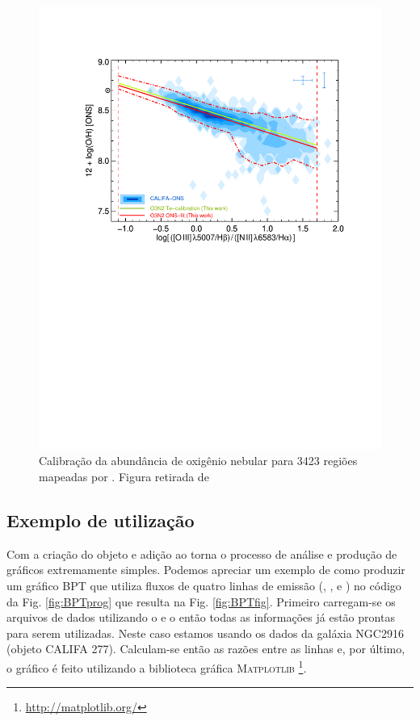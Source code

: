 \begin{figure}
	\centering
	\includegraphics[scale=0.8, trim=2cm 13cm 2cm 3cm, clip]{figuras/O3N2_CALIFA.pdf}
	\caption[Calibração da abundância de oxigênio no gás]{Calibração da abundância de oxigênio 
	nebular	para 3423 regiões \Hii mapeadas por \citet{Sanchez.etal.2013a}. Figura retirada de 
	\citet{Marino.etal.2013a}}
	\label{fig:Marino2013_O3N2}
\end{figure}

\subsection{Exemplo de utilização}
\label{sec:emline:datacube:exemple}

Com a criação do objeto \emldc e adição ao \pycasso torna o processo de análise e produção de
gráficos extremamente simples. Podemos apreciar um exemplo de como produzir um gráfico BPT
\citep{Baldwin.Phillips.Terlevich.1981a} que utiliza fluxos de quatro linhas de emissão (\Halpha,
\Hbeta, \OIII e \NII) no código da Fig. \ref{fig:BPTprog} que resulta na Fig.
\ref{fig:BPTfig}. Primeiro carregam-se os arquivos de dados utilizando o \pycasso e o \emldc então
todas as informações já estão prontas para serem utilizadas. Neste caso estamos usando os dados da
galáxia NGC2916 (objeto CALIFA 277). Calculam-se então as razões entre as linhas e, por último, o
gráfico é feito utilizando a biblioteca gráfica M\textsc{atplotlib}
\footnote{
	\href{http://matplotlib.org/}{http://matplotlib.org/}
}.


